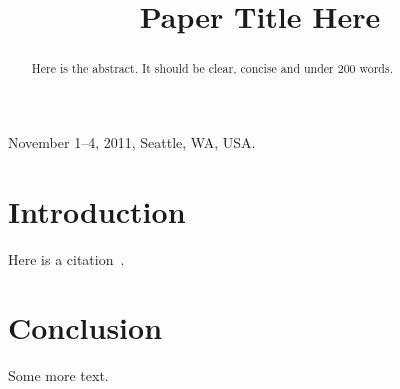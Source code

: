 \documentclass[10pt]{sigplan-proc-varsize-sensys11}
\begin{document}
\title{Paper Title Here}
\author{
}

 {November 1--4, 2011, Seattle, WA, USA.}

\maketitle

\begin{abstract}
Here is the abstract. It should be clear, concise and under 200 words.

\end{abstract}


\section{Introduction}

Here is a citation~\cite{lampson83hints}.

\section{Conclusion}

Some more text.


{\footnotesize


}
\end{document}
